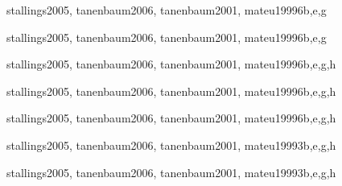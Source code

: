\begin{syllabus}
\begin{unit}{\OSMemoryManagement}{}{stallings2005, tanenbaum2006, tanenbaum2001, mateu1999}{6}{b,e,g}
    \OSMemoryManagementAllTopics
    \OSMemoryManagementAllLearningOutcomes
\end{unit}

\begin{unit}{\OSDeviceManagement}{}{stallings2005, tanenbaum2006, tanenbaum2001, mateu1999}{6}{b,e,g}
    \OSDeviceManagementAllTopics
    \OSDeviceManagementAllLearningOutcomes
\end{unit}

\begin{unit}{\OSSecurityandProtection}{}{stallings2005, tanenbaum2006, tanenbaum2001, mateu1999}{6}{b,e,g,h}
    \OSSecurityandProtectionAllTopics
    \OSSecurityandProtectionAllLearningOutcomes
\end{unit}

\begin{unit}{\OSFileSystems}{}{stallings2005, tanenbaum2006, tanenbaum2001, mateu1999}{6}{b,e,g,h}
    \OSFileSystemsAllTopics
    \OSFileSystemsAllLearningOutcomes
\end{unit}

\begin{unit}{\OSRealTimeandEmbeddedSystems}{}{stallings2005, tanenbaum2006, tanenbaum2001, mateu1999}{6}{b,e,g,h}
    \OSRealTimeandEmbeddedSystemsAllTopics
    \OSRealTimeandEmbeddedSystemsAllLearningOutcomes
\end{unit}

\begin{unit}{\OSFaultTolerance}{}{stallings2005, tanenbaum2006, tanenbaum2001, mateu1999}{3}{b,e,g,h}
    \OSFaultToleranceAllTopics
    \OSFaultToleranceAllLearningOutcomes
\end{unit}

\begin{unit}{\OSSystemPerformanceEvaluation}{}{stallings2005, tanenbaum2006, tanenbaum2001, mateu1999}{3}{b,e,g,h}
        \OSSystemPerformanceEvaluationAllTopics
        \OSSystemPerformanceEvaluationAllLearningOutcomes
    \end{unit}


\begin{coursebibliography}
\end{coursebibliography}

\end{syllabus}
